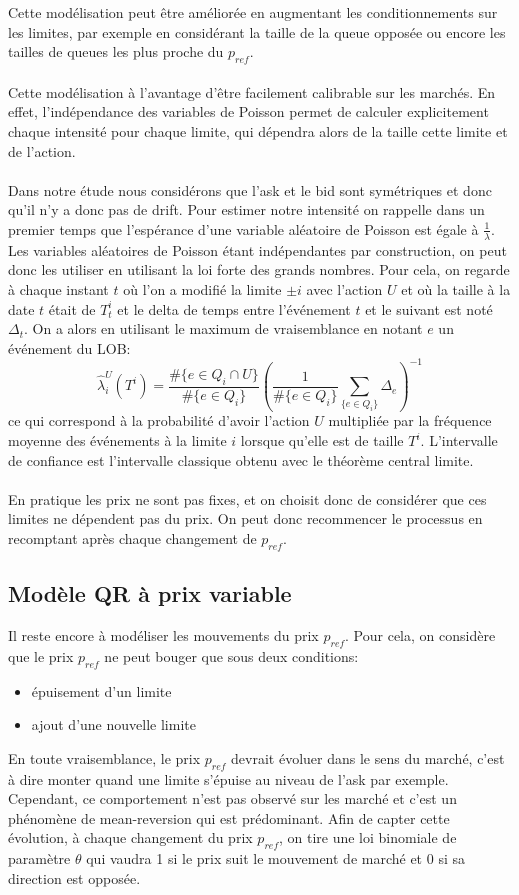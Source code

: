 \documentclass[12pt,a4paper]{article}
\theoremstyle{definition}
\theoremstyle{remark}
\begin{document}
\\
\\
Cette modélisation peut être améliorée en augmentant les conditionnements sur les limites, par exemple en considérant la taille de la queue opposée ou encore les tailles de queues les plus proche du $p_{ref}$.
\\
\\
Cette modélisation à l'avantage d'être facilement calibrable sur les marchés. En effet, l'indépendance des variables de Poisson permet de calculer explicitement chaque intensité pour chaque limite, qui dépendra alors de la taille cette limite et de l'action.
\\
\\
Dans notre étude nous considérons que l'ask et le bid sont symétriques et donc qu'il n'y a donc pas de drift. Pour estimer notre intensité on rappelle dans un premier temps que l'espérance d'une variable aléatoire de Poisson est égale à $\frac{1}{\lambda}$. Les variables aléatoires de Poisson étant indépendantes par construction, on peut donc les utiliser en utilisant la loi forte des grands nombres. Pour cela, on regarde à chaque instant $t$ où l'on a modifié la limite $\pm i$ avec l'action $U$ et où la taille à la date $t$ était de $T_t^{i}$ et le delta de temps entre l'événement $t$ et le suivant est noté $\Delta_t$. On a alors en utilisant le maximum de vraisemblance en notant $e$ un événement du LOB: 
$$\hat\lambda_i^U(T^{i})= \frac{\#\{e\in Q_i\cap U\}}{\#\{e\in Q_i\}}\left(\frac{1}{\#\{e\in Q_i\}}\sum_{\{e\in Q_i\}}\Delta_e\right)^{-1}$$ce qui correspond à la probabilité d'avoir l'action $U$ multipliée par la fréquence moyenne des événements à la limite $i$ lorsque qu'elle est de taille $T^{i}$. L'intervalle de confiance est l'intervalle classique obtenu avec le théorème central limite.
\\
\\ 
En pratique les prix ne sont pas fixes, et on choisit donc de considérer que ces limites ne dépendent pas du prix. On peut donc recommencer le processus en recomptant après chaque changement de $p_{ref}$.

\subsection{Modèle QR à prix variable}
Il reste encore à modéliser les mouvements du prix $p_{ref}$. Pour cela, on considère que le prix $p_{ref}$ ne peut bouger que sous deux conditions:
\begin{itemize}
    \item épuisement d'un limite
    \item ajout d'une nouvelle limite
\end{itemize}
En toute vraisemblance, le prix $p_{ref}$ devrait évoluer dans le sens du marché, c'est à dire monter quand une limite s'épuise au niveau de l'ask par exemple. Cependant, ce comportement n'est pas observé sur les marché et c'est un phénomène de mean-reversion qui est prédominant. Afin de capter cette évolution, à chaque changement du prix $p_{ref}$, on tire une loi binomiale de paramètre $\theta$ qui vaudra 1 si le prix suit le mouvement de marché et 0 si sa direction est opposée.
\hspace*{-7.5cm}
\end{document}
